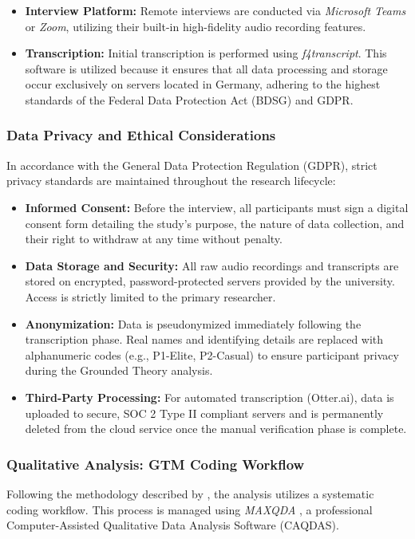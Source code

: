 \begin{itemize}
    \item \textbf{Interview Platform:} Remote interviews are conducted via \textit{Microsoft Teams} or \textit{Zoom}, utilizing their built-in high-fidelity audio recording features.
    \item \textbf{Transcription:} Initial transcription is performed using \textit{f4transcript}. This software is utilized because it ensures that all data processing and storage occur exclusively on servers located in Germany, adhering to the highest standards of the Federal Data Protection Act (BDSG) and GDPR.
\end{itemize}

\subsubsection{Data Privacy and Ethical Considerations}
In accordance with the General Data Protection Regulation (GDPR), strict privacy standards are maintained throughout the research lifecycle:

\begin{itemize}
    \item \textbf{Informed Consent:} Before the interview, all participants must sign a digital consent form detailing the study's purpose, the nature of data collection, and their right to withdraw at any time without penalty.
    \item \textbf{Data Storage and Security:} All raw audio recordings and transcripts are stored on encrypted, password-protected servers provided by the university. Access is strictly limited to the primary researcher.
    \item \textbf{Anonymization:} Data is pseudonymized immediately following the transcription phase. Real names and identifying details are replaced with alphanumeric codes (e.g., P1-Elite, P2-Casual) to ensure participant privacy during the Grounded Theory analysis.
    \item \textbf{Third-Party Processing:} For automated transcription (Otter.ai), data is uploaded to secure, SOC 2 Type II compliant servers and is permanently deleted from the cloud service once the manual verification phase is complete.
\end{itemize}

\subsubsection{Qualitative Analysis: GTM Coding Workflow}
Following the methodology described by \textcite{recker2021researchmethods}, the analysis utilizes a systematic coding workflow. This process is managed using \textit{MAXQDA} \autocite{MAXQDA2022}, a professional Computer-Assisted Qualitative Data Analysis Software (CAQDAS). 

